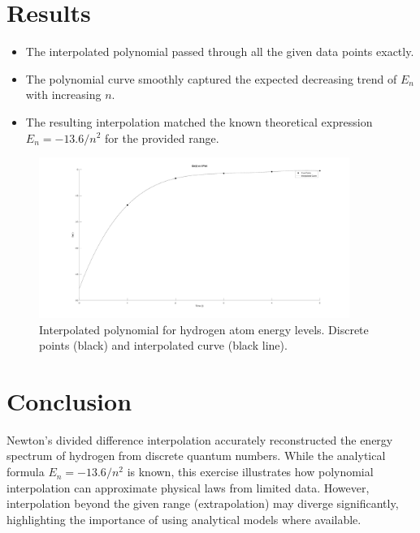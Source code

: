 \section*{Results}
\begin{itemize}
  \item The interpolated polynomial passed through all the given data points exactly.
  \item The polynomial curve smoothly captured the expected decreasing trend of $E_n$ with increasing $n$.
  \item The resulting interpolation matched the known theoretical expression $E_n = -13.6/n^2$ for the provided range.
\end{itemize}

\begin{figure}[h!]
  \centering
  \includegraphics[width=0.9\textwidth]{a2.jpg}
  \caption{Interpolated polynomial for hydrogen atom energy levels. Discrete points (black) and interpolated curve (black line).}
\end{figure}

\section*{Conclusion}
Newton’s divided difference interpolation accurately reconstructed the energy spectrum of hydrogen from discrete quantum numbers. While the analytical formula $E_n = -13.6/n^2$ is known, this exercise illustrates how polynomial interpolation can approximate physical laws from limited data. However, interpolation beyond the given range (extrapolation) may diverge significantly, highlighting the importance of using analytical models where available.
